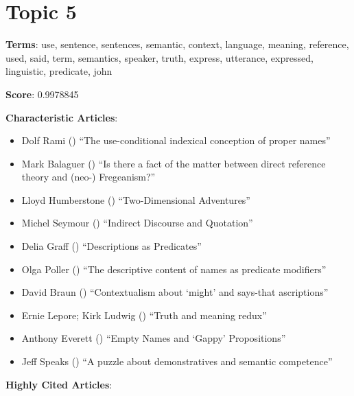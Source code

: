 \documentclass[
  10pt,
  letterpaper,
  DIV=11,
  numbers=noendperiod,
  twoside]{scrartcl}
\providecommand{\tightlist}{%
  \setlength{\itemsep}{0pt}\setlength{\parskip}{0pt}}\usepackage{longtable,booktabs,array}
\begin{document}
\section{Topic 5}\label{topic-5}

\textbf{Terms}: use, sentence, sentences, semantic, context, language,
meaning, reference, used, said, term, semantics, speaker, truth,
express, utterance, expressed, linguistic, predicate, john

\textbf{Score}: 0.9978845

\textbf{Characteristic Articles}:

\begin{itemize}
\tightlist
\item
  Dolf Rami () ``The
  use-conditional indexical conception of proper names''
\item
  Mark Balaguer () ``Is there a
  fact of the matter between direct reference theory and (neo-)
  Fregeanism?''
\item
  Lloyd Humberstone ()
  ``Two-Dimensional Adventures''
\item
  Michel Seymour () ``Indirect
  Discourse and Quotation''
\item
  Delia Graff () ``Descriptions
  as Predicates''
\item
  Olga Poller () ``The
  descriptive content of names as predicate modifiers''
\item
  David Braun () ``Contextualism
  about `might' and says-that ascriptions''
\item
  Ernie Lepore; Kirk Ludwig ()
  ``Truth and meaning redux''
\item
  Anthony Everett () ``Empty
  Names and `Gappy' Propositions''
\item
  Jeff Speaks () ``A puzzle about
  demonstratives and semantic competence''
\end{itemize}

\textbf{Highly Cited Articles}:
\end{document}
